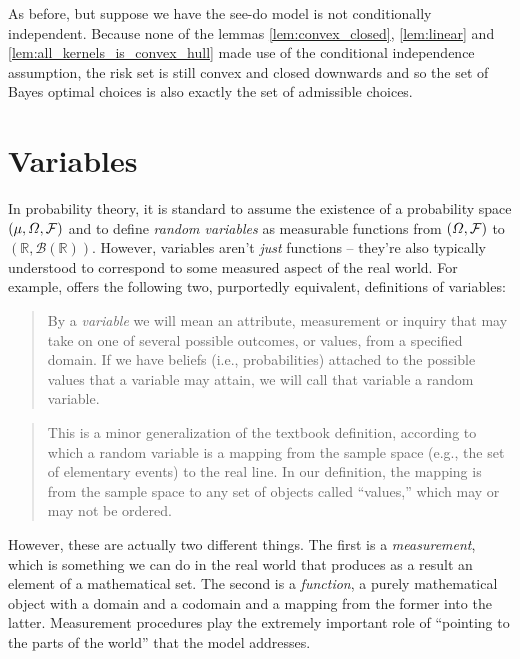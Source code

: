 \begin{example}\label{ex:cc_nonsdt}
As before, but suppose we have the see-do model is not conditionally independent. Because none of the lemmas \ref{lem:convex_closed}, \ref{lem:linear} and \ref{lem:all_kernels_is_convex_hull} made use of the conditional independence assumption, the risk set is still convex and closed downwards and so the set of Bayes optimal choices is also exactly the set of admissible choices.
\end{example}

\section{Variables}\label{sec:variable}

In probability theory, it is standard to assume the existence of a probability space $(\mu,\Omega,\mathcal{F})$ and to define \emph{random variables} as measurable functions from $(\Omega,\mathcal{F})$ to $(\mathbb{R},\mathcal{B}(\mathbb{R}))$. However, variables aren't \emph{just} functions -- they're also typically understood to correspond to some measured aspect of the real world. For example, \citet{pearl_causality:_2009} offers the following two, purportedly equivalent, definitions of variables:
\begin{quote}
By a \emph{variable} we will mean an attribute, measurement or inquiry that may take on one of several possible outcomes, or values, from a specified domain. If we have beliefs (i.e., probabilities) attached to the possible values that a variable may attain, we will call that variable a random variable.
\end{quote}

\begin{quote}
This is a minor generalization of the textbook definition, according to which a random variable is a mapping from the sample space (e.g., the set of elementary events) to the real line. In our definition, the mapping is from the sample space to any set of objects called ``values,'' which may or may not be ordered.
\end{quote}

However, these are actually two different things. The first is a \emph{measurement}, which is something we can do in the real world that produces as a result an element of a mathematical set. The second is a \emph{function}, a purely mathematical object with a domain and a codomain and a mapping from the former into the latter. Measurement procedures play the extremely important role of ``pointing to the parts of the world'' that the model addresses.

